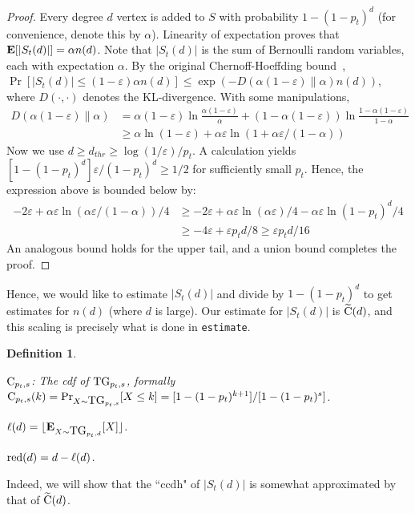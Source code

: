 \documentclass[11pt]{article}
\newtheorem{definition}{Definition}
\theoremstyle{definition}
\newcommand{\EX}{\hbox{\bf E}}
\def\eps{\varepsilon}
\def\floor#1{\lfloor {#1} \rfloor}
\newcommand{\tC}{\widetilde{\hbox{C}}}
\newcommand{\tg}{\hbox{TG}}
\newcommand{\cdf}{\hbox{C}}
\newcommand{\rd}{{\hbox{red}}}
\newcommand{\est}{{\tt estimate}}
\begin{document}
\begin{proof} Every degree $d$ vertex is added to $S$ with probability $1-(1-p_t)^d$ (for convenience,
denote this by $\alpha$).
Linearity of expectation proves that $\EX[|S_t(d)|] = \alpha n(d)$.
Note that $|S_t(d)|$ is the sum of Bernoulli random variables, each with expectation $\alpha$.
By the original Chernoff-Hoeffding bound~\cite{Ch52}, $\Pr[|S_t(d)| \leq (1-\eps)\alpha n(d)] \leq \exp(-D(\alpha(1-\eps) \| \alpha) n(d))$,
where $D(\cdot,\cdot)$ denotes the KL-divergence. With some manipulations,
\begin{align*}
D(\alpha(1-\eps) \| \alpha) 
& = \alpha(1-\eps) \ln\frac{\alpha(1-\eps)}{\alpha} + (1-\alpha(1-\eps)) \ln\frac{1-\alpha(1-\eps)}{1-\alpha} \\
& \geq \alpha\ln(1-\eps) + \alpha \eps \ln(1 + \alpha\eps/(1-\alpha))
\end{align*}
Now we use $d \geq d_{thr} \geq \log(1/\eps)/p_t$. A calculation yields
$[1-(1-p_t)^d]\eps/(1-p_t)^d \geq 1/2$ for sufficiently small $p_t$.
Hence, the expression above is bounded below by:
\begin{align*}
-2\eps + \alpha \eps \ln(\alpha\eps/(1-\alpha))/4
& \geq -2\eps + \alpha\eps \ln(\alpha\eps)/4 - \alpha\eps\ln(1-p_t)^d/4 \\
& \geq -4\eps + \eps p_td/8 \geq \eps p_td/16
\end{align*}
An analogous bound holds for the upper tail, and a union bound completes the proof.
\end{proof}

Hence, we would like to estimate $|S_t(d)|$ and divide by $1-(1-p_t)^d$ to get estimates for
$n(d)$ (where $d$ is large). Our estimate for $|S_t(d)|$ is $\tC(d)$, and this
scaling is precisely what is done in \est.

\begin{definition} \label{def:geocdf}
\begin{asparaitem}
    \item $\cdf_{p_t,s}$: The cdf of $\tg_{p_t,s}$, formally $\cdf_{p_t,s}(k) = \Pr_{X \sim \tg_{p_t,s}}[X \leq k] = [1 - (1-p_t)^{k+1}]/[1-(1-p_t)^s]$.
    \item $\ell(d) = \floor{\EX_{X \sim \tg_{p_t,d}}[X]}$.
    \item $\rd(d) = d - \ell(d)$.
\end{asparaitem}
\end{definition}

Indeed, we will show that the ``ccdh" of
$|S_t(d)|$ is somewhat approximated by that of $\tC(d)$.
\end{document}
